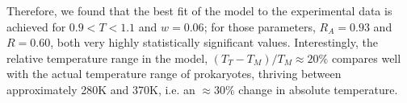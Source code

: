 \documentclass[10pt,letterpaper]{article}
\begin{document}
Therefore, we found that the best fit of the model to the experimental data is achieved for $0.9<T<1.1$ and $w=0.06$; for those parameters, $R_A=0.93$ and $R=0.60$, both very highly statistically significant values. Interestingly, the relative temperature range in the model, $(T_T-T_M)/T_M\approx 20\%$ compares well with the actual temperature range of prokaryotes, thriving between approximately 280K and 370K, i.e. an $\approx 30\%$ change in absolute temperature.





  
 
    
    
\end{document}
